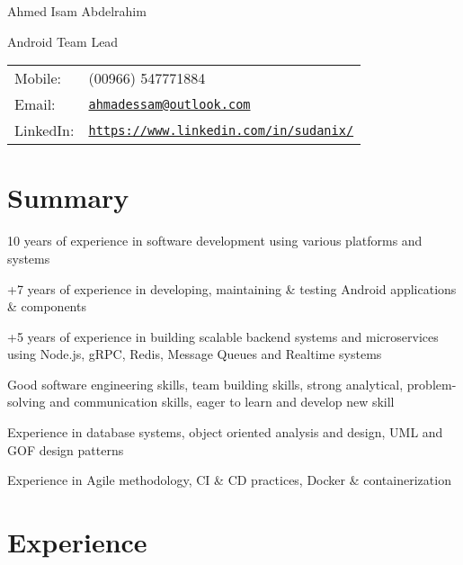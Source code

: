 \documentclass[letterpaper]{article}
\def\name{Ahmed Isam Abdelrahim}
\renewenvironment{itemize}{
  \begin{list}{}{
    \setlength{\leftmargin}{1.5em}
  }
}{
  \end{list}
}
\begin{document}
{\huge \name}


\vspace{0.10in}

\begin{minipage}{0.45\linewidth}
  Android Team Lead \\
 
\end{minipage}
\begin{minipage}{0.45\linewidth}
  \begin{tabular}{ll}
    Mobile: & (00966) 547771884 \\
    Email: & \href{mailto:ahmadessam@outlook.com}{\tt ahmadessam@outlook.com} \\
    LinkedIn: & \href{https://www.linkedin.com/in/sudanix/}{\tt https://www.linkedin.com/in/sudanix/} \\
  \end{tabular}
\end{minipage}

\section*{Summary}
\begin{itemize}
\item 10 years of experience in software development using various platforms and systems 
\item +7 years of experience in developing, maintaining \& testing Android applications \& components
\item +5 years of experience in building scalable backend systems and microservices using Node.js, gRPC, Redis, Message Queues and Realtime systems
\item Good software engineering skills, team building skills, strong analytical, problem-solving and communication skills, eager to learn and develop new skill
\item Experience in database systems, object oriented analysis and design, UML and GOF design patterns
\item Experience in Agile methodology, CI \& CD practices, Docker \& containerization
\end{itemize}


\section*{Experience}
\end{document}
